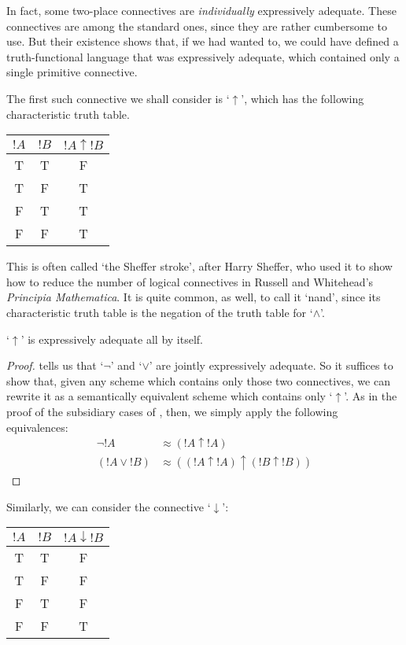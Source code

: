 \documentclass[../../../include/open-logic-section]{subfiles}
\begin{document}
In fact, some two-place connectives are \emph{individually} expressively adequate. These connectives are among the standard ones, since they are rather cumbersome to use. But their existence shows that, if we had wanted to, we could have defined a truth-functional language that was expressively adequate, which contained only a single primitive connective.

The first such connective we shall consider is `$\uparrow$', which has the following characteristic truth table. 
\begin{center}
\begin{tabular}{c c | c}
${!A}$ & ${!B}$ & ${!A} \mathrel{\uparrow} {!B}$\\
\hline
 T & T & F \\
 T & F & T \\
 F & T & T  \\
 F & F & T
\end{tabular}
\end{center}
 This is often called `the Sheffer stroke', after Harry Sheffer, who used it to show how to reduce the number of logical connectives in Russell and Whitehead's \emph{Principia Mathematica}. It is quite common, as well, to call it `nand', since its characteristic truth table is the negation of the truth table for `$\land$'.
\begin{prop}`$\uparrow$' is expressively adequate all by itself. 
	\begin{proof}
		 tells us that `$\lnot$' and `$\lor$' are jointly expressively adequate. So it suffices to show that, given any scheme which contains only those two connectives, we can rewrite it as a semantically equivalent scheme which contains only `$\uparrow$'. As in the proof of the subsidiary cases of , then, we simply apply the following equivalences:
		\begin{align*}
			\lnot {!A} &\approx ({!A} \uparrow {!A})\\
			({!A} \lor {!B}) & \approx (({!A} \uparrow {!A}) \uparrow ({!B} \uparrow {!B}))
		\end{align*}
	\end{proof}
\end{prop}\noindent
Similarly, we can consider the connective `$\downarrow$':
\begin{center}
\begin{tabular}{c c | c}
${!A}$ & ${!B}$ & ${!A} \mathrel{\downarrow} {!B}$\\
\hline
 T & T & F \\
 T & F & F  \\
 F & T & F  \\
 F & F & T
\end{tabular}
\end{center}
\end{document}
